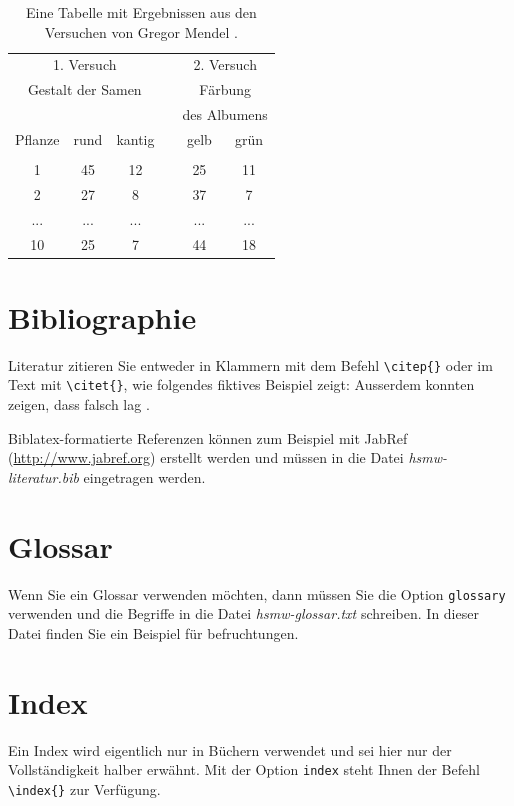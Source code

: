 \documentclass[nomenclature, norefpage, oneside, glossary, hypertext,multiauthor]{hsmw-class}
\begin{document}
\begin{table}
\centering
\begin{tabular}{cccccc}
\hline
\multicolumn{3}{c}{1. Versuch} &  & \multicolumn{2}{c}{2. Versuch}\\
\multicolumn{3}{c}{Gestalt der Samen} & & \multicolumn{2}{c}{Färbung }\\
& & & & \multicolumn{2}{c}{des Albumens}\\
Pflanze & rund & kantig &   &  gelb &  grün  \\
\cline{1-3} \cline{5-6} \\
1 & 45 & 12 &   &  25 &  11  \\
2 & 27 & 8 &   &  37 &  7  \\
... & ... & ... &   &  ... &  ...  \\
10 & 25 & 7 &   &  44 &  18  \\
\hline
\end{tabular}
\caption{Eine Tabelle mit Ergebnissen aus den Versuchen von Gregor Mendel \citep{Mendel1866}.}
\label{tab:mendel}
\end{table}

 
\section{Bibliographie}
Literatur zitieren Sie entweder in Klammern mit dem Befehl \verb+\citep{}+\citep{Huang1976,Wuenschiers2004,Stark2014} oder im Text mit \verb+\citet{}+, wie folgendes fiktives Beispiel zeigt: Ausserdem konnten \citet{Kanai2017} zeigen, dass \citep{ford} falsch lag \citep{Jing2016}.

Biblatex-formatierte Referenzen können zum Beispiel mit JabRef (\url{http://www.jabref.org}) erstellt werden und müssen in die Datei \textit{hsmw-literatur.bib} eingetragen werden.
 

\section{Glossar}
Wenn Sie ein Glossar verwenden möchten, dann müssen Sie die Option \texttt{glossary} verwenden und die Begriffe in die Datei \textit{hsmw-glossar.txt} schreiben. In dieser Datei finden Sie ein Beispiel für \gls{befruchtungen}. 


\section{Index}
Ein Index wird eigentlich nur in Büchern verwendet und sei hier nur der Vollständigkeit halber erwähnt. Mit der Option \texttt{index} steht Ihnen der Befehl \verb+\index{}+ zur Verfügung.
\end{document}
